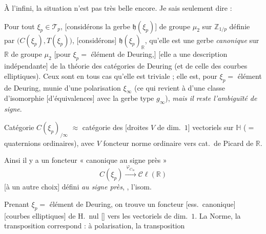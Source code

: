 \documentclass[11pt,a4paper]{article}
\begin{document}
À l'infini, la situation n'est pas très belle encore. Je sais seulement
dire :

Pour tout $\xi_{p} \in \mathcal{T}_{p}$, [considérons la gerbe
$\mathfrak{h}(\xi_{p})$]  de groupe $\mu_{2}$ sur $\mathbb{Z}_{1/p}$
définie par $\bigl(C(\xi_{p}), T(\xi_{p})\bigr)$, \struck{\ill{}}
[considérons] $\mathfrak{h}(\xi_{p})_{\mathbb{R}}$, qu'elle est une gerbe
\emph{canonique} sur $\mathbb{R}$ de groupe $\mu_{2}$ [pour $\xi_{p} =$
élément de Deuring,]  [elle a une description
indépendante] de la théorie des catégories de Deuring (et de celle des
courbes elliptiques). Ceux sont en tous cas \ill{} qu'elle est triviale ;
elle est, pour $\xi_{p} =$ élément de Deuring, munie d'une polarisation
$\xi_{\infty}$ (ce qui revient à \ill{} d'une classe d'isomorphie
[d'équivalences] avec la gerbe type $g_{\infty}$), \emph{mais il reste
l'ambiguïté de signe}.

Catégorie $C(\xi_{p})_{/\infty}$ \struck{---} $\approx$ catégorie des
[droites $V$ de dim.~$1$] vectoriels  sur $\mathbb{H}$
($=$ quaternions ordinaires), avec \struck{\ill{}} $V$ foncteur norme
ordinaire vers cat.\ de Picard de $\mathbb{R}$.

Ainsi il y a un foncteur « canonique au signe près »
\[
  C(\xi_{p}) \xrightarrow{\ \varphi_{C_{\infty}}\ }
  \mathcal{C}\ell(\mathbb{R})
\]
 \ill{} [à un autre
choix] défini \emph{au signe près}, \ill{}, l'isom.

Prenant $\xi_{p} =$ élément de  Deuring, on trouve un
foncteur [ess.\ canonique]  [courbes elliptiques] de H.\ nul
[] vers les vectoriels de dim.~$1$. La
\struck{\ill{}} Norme, la transposition correspond : à polarisation, la
transposition
\end{document}
